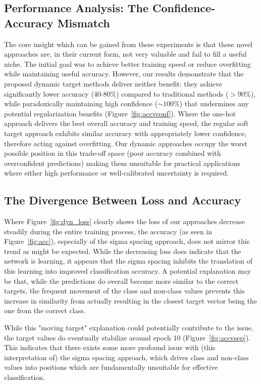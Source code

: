 \documentclass[12pt,fleqn,a4paper]{article}
\begin{document}
\subsection{Performance Analysis: The Confidence-Accuracy Mismatch}
The core insight which can be gained from these experiments is that these novel approaches are, in their current form, not very valuable and fail to fill a useful niche. The initial goal was to achieve better training speed or reduce overfitting while maintaining useful accuracy. However, our results demonstrate that the proposed dynamic target methods deliver neither benefit: they achieve significantly lower accuracy (40-80\%) compared to traditional methods ($> 90\%$), while paradoxically maintaining high confidence ($\sim 100\%$) that undermines any potential regularization benefits (Figure~\ref{fig:accvconf}).
Where the one-hot approach delivers the best overall accuracy and training speed, the regular soft target approach exhibits similar accuracy with appropriately lower confidence, therefore acting against overfitting. Our dynamic approaches occupy the worst possible position in this trade-off space (poor accuracy combined with overconfident predictions) making them unsuitable for practical applications where either high performance or well-calibrated uncertainty is required.

\subsection{The Divergence Between Loss and Accuracy}
Where Figure~\ref{fig:dyn_loss} clearly shows the loss of our approaches decrease steadily during the entire training process, the accuracy (as seen in Figure~\ref{fig:acc}), especially of the sigma spacing approach, does not mirror this trend as might be expected. While the decreasing loss does indicate that the network is learning, it appears that the sigma spacing inhibits the translation of this learning into improved classification accuracy. A potential explanation may be that, while the predictions do overall become more similar to the correct targets, the frequent movement of the class and non-class values prevents this increase in similarity from actually resulting in the closest target vector being the one from the correct class.

While this "moving target" explanation could potentially contribute to the issue, the target values do eventually stabilize around epoch 10 (Figure~\ref{fig:accvsep}). This indicates that there exists some more profound issue with (this interpretation of) the sigma spacing approach, which drives class and non-class values into positions which are fundamentally unsuitable for effective classification.
\end{document}

